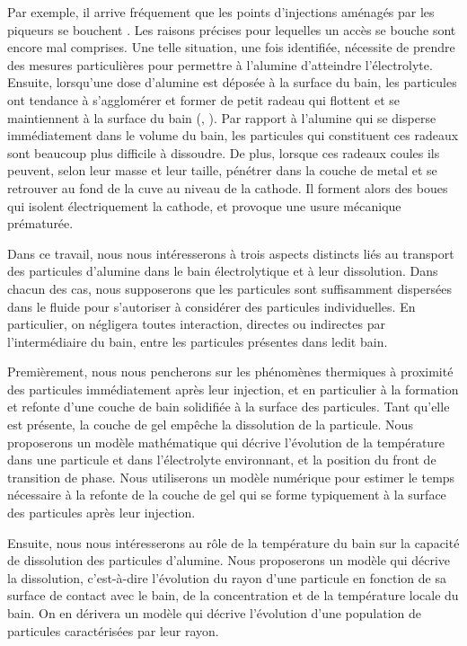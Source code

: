 Par exemple, il arrive fréquement que les points d'injections
aménagés par les piqueurs se bouchent \cite{Dion2017}. Les raisons
précises pour lequelles un accès se bouche sont encore mal
comprises. Une telle situation, une fois identifiée, nécessite de
prendre des mesures particulières pour permettre à l'alumine
d'atteindre l'électrolyte. Ensuite, lorsqu'une dose d'alumine est
déposée à la surface du bain, les particules ont tendance à
s'agglomérer et former de petit radeau qui flottent et se maintiennent
à la surface du bain (\cite{Dassylva2015}, \cite{Kaszas2017}). Par
rapport à l'alumine qui se disperse immédiatement dans le volume
du bain, les particules qui constituent ces radeaux sont beaucoup plus
difficile à dissoudre. De plus, lorsque ces radeaux coules ils
peuvent, selon leur masse et leur taille, pénétrer dans la couche
de metal et se retrouver au fond de la cuve au niveau de la
cathode. Il forment alors des boues qui isolent électriquement la
cathode, et provoque une usure mécanique prématurée.

Dans ce travail, nous nous intéresserons à trois aspects distincts
liés au transport des particules d'alumine dans le bain électrolytique
et à leur dissolution. Dans chacun des cas, nous supposerons que les
particules sont suffisamment dispersées dans le fluide pour
s'autoriser à considérer des particules individuelles. En particulier,
on négligera toutes interaction, directes ou indirectes par
l'intermédiaire du bain, entre les particules présentes dans ledit bain.

Premièrement, nous nous pencherons sur les phénomènes thermiques à
proximité des particules immédiatement après leur injection, et en
particulier à la formation et refonte d'une couche de bain solidifiée
à la surface des particules. Tant qu'elle est présente, la couche de
gel empêche la dissolution de la particule. Nous proposerons un modèle
mathématique qui décrive l'évolution de la température dans une
particule et dans l'électrolyte environnant, et la position du front
de transition de phase. Nous utiliserons un modèle numérique pour
estimer le temps nécessaire à la refonte de la couche de gel qui se
forme typiquement à la surface des particules après leur injection.

Ensuite, nous nous intéresserons au rôle de la température du bain sur
la capacité de dissolution des particules d'alumine. Nous proposerons
un modèle qui décrive la dissolution, c'est-à-dire l'évolution du
rayon d'une particule en fonction de sa surface de contact avec le
bain, de la concentration et de la température locale du bain. On en
dérivera un modèle qui décrive l'évolution d'une population de
particules caractérisées par leur rayon.

